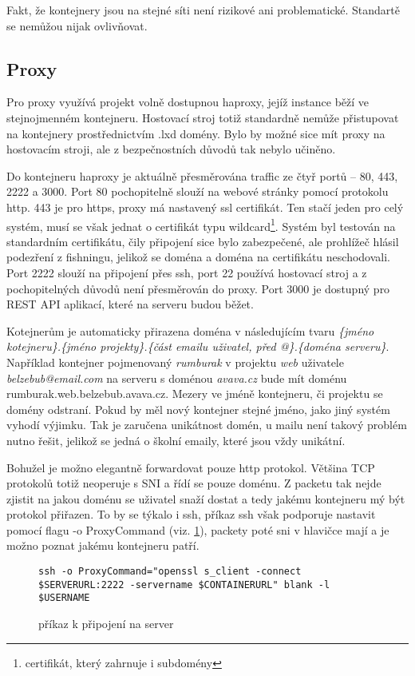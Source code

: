 \documentclass[a4paper,oneside,12pt]{report}
\begin{document}
Fakt, že kontejnery jsou na stejné síti není rizikové ani problematické.
Standartě se nemůžou nijak ovlivňovat.

\subsection{Proxy}

Pro proxy využívá projekt volně dostupnou haproxy, jejíž instance běží ve stejnojmenném kontejneru.
Hostovací stroj totiž standardně nemůže přistupovat na kontejnery prostřednictvím .lxd domény.
Bylo by možné sice mít proxy na hostovacím stroji, ale z bezpečnostních důvodů tak nebylo učiněno.

Do kontejneru haproxy je aktuálně přesměrována traffic ze čtyř portů -- 80, 443, 2222 a 3000.
Port 80 pochopitelně slouží na webové stránky pomocí protokolu http.
443 je pro https, proxy má nastavený ssl certifikát.
Ten stačí jeden pro celý systém, musí se však jednat o certifikát typu wildcard\footnote{certifikát, který zahrnuje i subdomény}.
Systém byl testován na standardním certifikátu, čily připojení sice bylo zabezpečené, ale prohlížeč hlásil podezření z fishningu, jelikož se doména a doména na certifikátu neschodovali.
Port 2222 slouží na připojení přes ssh, port 22 používá hostovací stroj a z pochopitelných důvodů není přesměrován do proxy.
Port 3000 je dostupný pro REST API aplikací, které na serveru budou běžet.

Kotejnerům je automaticky přirazena doména v následujícím tvaru \textit{\{jméno kotejneru\}.\{jméno projekty\}.\{část emailu uživatel, před @\}.\{doména serveru\}}.
Například kontejner pojmenovaný \textit{rumburak} v projektu \textit{web} uživatele \textit{belzebub@email.com} na serveru s doménou \textit{avava.cz} bude mít doménu {rumburak.web.belzebub.avava.cz}.
Mezery ve jméně kontejneru, či projektu se domény odstraní.
Pokud by měl nový kontejner stejné jméno, jako jiný systém vyhodí výjimku.
Tak je zaručena unikátnost domén, u mailu není takový problém nutno řešit, jelikož se jedná o školní emaily, které jsou vždy unikátní.

Bohužel je možno elegantně forwardovat pouze http protokol.
Většina TCP protokolů totiž neoperuje s SNI a řídí se pouze doménu.
Z packetu tak nejde zjistit na jakou doménu se uživatel snaží dostat a tedy jakému kontejneru mý být protokol přiřazen.
To by se týkalo i ssh, příkaz ssh však podporuje nastavit pomocí flagu -o ProxyCommand (viz. \ref{fig:sshcom}), packety poté sni v hlavičce mají a je možno poznat jakému kontejneru patří.
\begin{figure}[h]
\begin{lstlisting}[breaklines]
ssh -o ProxyCommand="openssl s_client -connect $SERVERURL:2222 -servername $CONTAINERURL" blank -l $USERNAME
\end{lstlisting}
\caption{příkaz k připojení na server\protect\footnotemark}
\label{fig:sshcom}
\end{figure}
\end{document}
